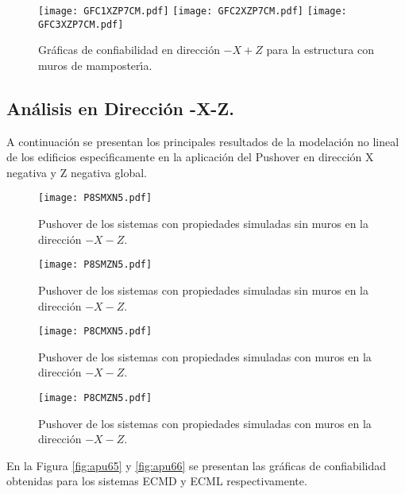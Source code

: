 \begin{figure} [htbp]
\centering
\texttt{[image: GFC1XZP7CM.pdf]}
\texttt{[image: GFC2XZP7CM.pdf]}
\texttt{[image: GFC3XZP7CM.pdf]}
\caption{Gr\'aficas de confiabilidad en direcci\'on $-X+Z$ para la estructura con muros de mamposter\'{\i}a.}
\label{fig:apu60}
\end{figure}

\paragraph{}

\newpage

\subsection{An\'alisis en Direcci\'on -X-Z.}

A continuaci\'on se presentan los principales resultados de la modelaci\'on no lineal de los edificios espec\'{\i}ficamente en la aplicaci\'on del Pushover en direcci\'on X negativa y Z negativa global.

\begin{figure} [htbp]
\texttt{[image: P8SMXN5.pdf]}
\caption{Pushover de los sistemas con propiedades simuladas sin muros en la direcci\'on $-X-Z$.}
\label{fig:apu61}
\end{figure}

\begin{figure} [htbp]
\texttt{[image: P8SMZN5.pdf]}
\caption{Pushover de los sistemas con propiedades simuladas sin muros en la direcci\'on $-X-Z$.}
\label{fig:apu62}
\end{figure}

\begin{figure} [htbp]
\texttt{[image: P8CMXN5.pdf]}
\caption{Pushover de los sistemas con propiedades simuladas con muros en la direcci\'on $-X-Z$.}
\label{fig:apu63}
\end{figure}

\begin{figure} [htbp]
\texttt{[image: P8CMZN5.pdf]}
\caption{Pushover de los sistemas con propiedades simuladas con muros en la direcci\'on $-X-Z$.}
\label{fig:apu64}
\end{figure}

En la Figura \ref{fig:apu65} y \ref{fig:apu66} se presentan las gr\'aficas de confiabilidad obtenidas para los sistemas ECMD y ECML respectivamente.

